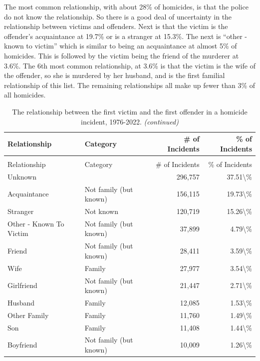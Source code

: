 \documentclass[
]{krantz}
\begin{document}
The most common relationship, with about 28\% of homicides,
is that the police do not know the relationship. So there is
a good deal of uncertainty in the relationship between
victims and offenders. Next is that the victim is the
offender's acquaintance at 19.7\% or is a stranger at
15.3\%. The next is ``other - known to victim'' which is
similar to being an acquaintance at almost 5\% of homicides.
This is followed by the victim being the friend of the
murderer at 3.6\%. The 6th most common relationship, at
3.6\% is that the victim is the wife of the offender, so she
is murdered by her husband, and is the first familial
relationship of this list. The remaining relationships all
make up fewer than 3\% of all homicides.

\begin{longtable}[t]{l|l|r|r}
\caption{\label{tab:shrRelationship}The relationship between the first victim and the first offender in a homicide incident, 1976-2022.}\\
\hline
Relationship & Category & \# of Incidents & \% of Incidents\\
\hline
\endfirsthead
\caption[]{\label{tab:shrRelationship}The relationship between the first victim and the first offender in a homicide incident, 1976-2022. \textit{(continued)}}\\
\hline
Relationship & Category & \# of Incidents & \% of Incidents\\
\hline
\endhead
Unknown &  & 296,757 & 37.51\textbackslash{}\%\\
\hline
Acquaintance & Not family (but known) & 156,115 & 19.73\textbackslash{}\%\\
\hline
Stranger & Not known & 120,719 & 15.26\textbackslash{}\%\\
\hline
Other - Known To Victim & Not family (but known) & 37,899 & 4.79\textbackslash{}\%\\
\hline
Friend & Not family (but known) & 28,411 & 3.59\textbackslash{}\%\\
\hline
Wife & Family & 27,977 & 3.54\textbackslash{}\%\\
\hline
Girlfriend & Not family (but known) & 21,447 & 2.71\textbackslash{}\%\\
\hline
Husband & Family & 12,085 & 1.53\textbackslash{}\%\\
\hline
Other Family & Family & 11,760 & 1.49\textbackslash{}\%\\
\hline
Son & Family & 11,408 & 1.44\textbackslash{}\%\\
\hline
Boyfriend & Not family (but known) & 10,009 & 1.26\textbackslash{}\%\\

\end{longtable}
\end{document}
